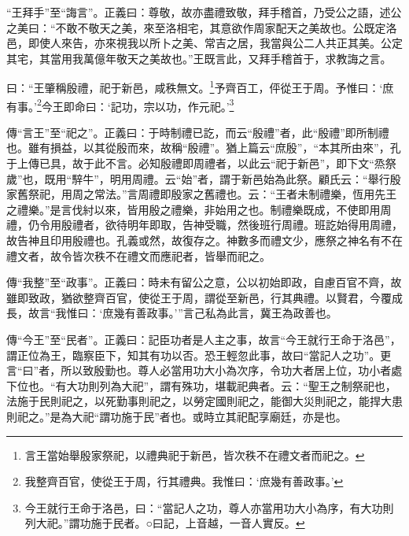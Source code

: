 {\noindent\shu{}\fzkt “王拜手”至“誨言”。正義曰：尊敬，故亦盡禮致敬，拜手稽首，乃受公之語，述公之美曰：“不敢不敬天之美，來至洛相宅，其意欲作周家配天之美故也。公既定洛邑，即使人來告，亦來視我以所卜之美、常吉之居，我當與公二人共正其美。公定其宅，其當用我萬億年敬天之美故也。”王既言此，又拜手稽首于，求教誨之言。 \par}

曰：“王肇稱殷禮，祀于新邑，咸秩無文。\footnote{言王當始舉殷家祭祀，以禮典祀于新邑，皆次秩不在禮文者而祀之。}予齊百工，伻從王于周。予惟曰：‘庶有事。’\footnote{我整齊百官，使從王于周，行其禮典。我惟曰：‘庶幾有善政事。’}今王即命曰：‘記功，宗以功，作元祀。’\footnote{今王就行王命于洛邑，曰：“當記人之功，尊人亦當用功大小為序，有大功則列大祀。”謂功施于民者。○曰記，上音越，一音人實反。}


{\noindent\zhuan{}\fzbyks 傳“言王”至“祀之”。正義曰：于時制禮已訖，而云“殷禮”者，此“殷禮”即所制禮也。雖有損益，以其從殷而來，故稱“殷禮”。猶上篇云“庶殷”，“本其所由來”，孔于上傳已具，故于此不言。必知殷禮即周禮者，以此云“祀于新邑”，即下文“烝祭歲”也，既用“騂牛”，明用周禮。云“始”者，謂于新邑始為此祭。顧氏云：“舉行殷家舊祭祀，用周之常法。”言周禮即殷家之舊禮也。云：“王者未制禮樂，恆用先王之禮樂。”是言伐紂以來，皆用殷之禮樂，非始用之也。制禮樂既成，不使即用周禮，仍令用殷禮者，欲待明年即取，告神受職，然後班行周禮。班訖始得用周禮，故告神且印用殷禮也。孔義或然，故復存之。神數多而禮文少，應祭之神名有不在禮文者，故令皆次秩不在禮文而應祀者，皆舉而祀之。 \par}

{\noindent\zhuan{}\fzbyks 傳“我整”至“政事”。正義曰：時未有留公之意，公以初始即政，自慮百官不齊，故雖即致政，猶欲整齊百官，使從王于周，謂從至新邑，行其典禮。以賢君，今覆成長，故言“我惟曰：‘庶幾有善政事。’”言己私為此言，冀王為政善也。 \par}

{\noindent\zhuan{}\fzbyks 傳“今王”至“民者”。正義曰：記臣功者是人主之事，故言“今王就行王命于洛邑”，謂正位為王，臨察臣下，知其有功以否。恐王輕忽此事，故曰“當記人之功”。更言“曰”者，所以致殷勤也。尊人必當用功大小為次序，令功大者居上位，功小者處下位也。“有大功則列為大祀”，謂有殊功，堪載祀典者。云：“聖王之制祭祀也，法施于民則祀之，以死勤事則祀之，以勞定國則祀之，能御大災則祀之，能捍大患則祀之。”是為大祀“謂功施于民”者也。或時立其祀配享廟廷，亦是也。 \par}

